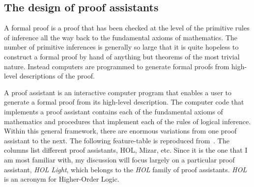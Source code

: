 \documentclass{llncs}
\begin{document}
\subsection{The design of proof assistants}

A formal proof is a proof that has been checked at the level of the
primitive rules of inference all the way back to the fundamental
axioms of mathematics.  The number of primitive inferences is
generally so large that it is quite hopeless to construct a formal
proof by hand of anything but theorems of the most trivial nature.
Instead computers are programmed to generate formal proofs from
high-level descriptions of the proof.

A proof assistant is an interactive computer program that enables a user to
generate a formal proof from its high-level description.  The computer code
that implements a proof assistant contains each of the fundamental axioms
of mathematics and procedures that implement each of the rules of logical
inference.  Within this general framework, there are enormous variations
from one proof assistant to the next. The following feature-table is
reproduced from~\cite{wiedijk:17}.  The columns list different proof
assistants, HOL, Mizar, etc.  Since it is the one that I am most familiar with,
my discussion will focus largely on a particular
proof assistant, {\it HOL Light}, which belongs to the {\it HOL} family of
proof assistants. {\it HOL} is an acronym for Higher-Order Logic.
\end{document}
